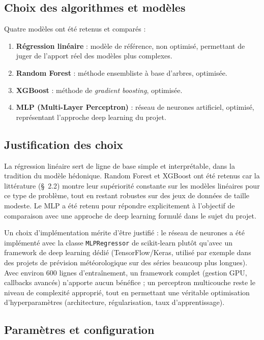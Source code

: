 \subsection{Choix des algorithmes et modèles}

Quatre modèles ont été retenus et comparés :
\begin{enumerate}
  \item \textbf{Régression linéaire} : modèle de référence, non optimisé, permettant de juger
  de l'apport réel des modèles plus complexes.
  \item \textbf{Random Forest} \citep{breiman2001randomforests} : méthode ensembliste à base
  d'arbres, optimisée.
  \item \textbf{XGBoost} \citep{chen2016xgboost} : méthode de \emph{gradient boosting},
  optimisée.
  \item \textbf{MLP (Multi-Layer Perceptron)} : réseau de neurones artificiel, optimisé,
  représentant l'approche deep learning du projet.
\end{enumerate}

\subsection{Justification des choix}

La régression linéaire sert de ligne de base simple et interprétable, dans la tradition du
modèle hédonique. Random Forest et XGBoost ont été retenus car la littérature
(\S~2.2) montre leur supériorité constante sur les modèles linéaires pour ce type de problème,
tout en restant robustes sur des jeux de données de taille modeste. Le MLP a été retenu pour
répondre explicitement à l'objectif de comparaison avec une approche de deep learning formulé
dans le sujet du projet.

Un choix d'implémentation mérite d'être justifié : le réseau de neurones a été implémenté avec
la classe \texttt{MLPRegressor} de scikit-learn plutôt qu'avec un framework de deep learning
dédié (TensorFlow/Keras, utilisé par exemple dans des projets de prévision météorologique sur
des séries beaucoup plus longues). Avec environ 600 lignes d'entraînement, un framework complet
(gestion GPU, callbacks avancés) n'apporte aucun bénéfice ; un perceptron multicouche reste le
niveau de complexité approprié, tout en permettant une véritable optimisation d'hyperparamètres
(architecture, régularisation, taux d'apprentissage).

\subsection{Paramètres et configuration}

